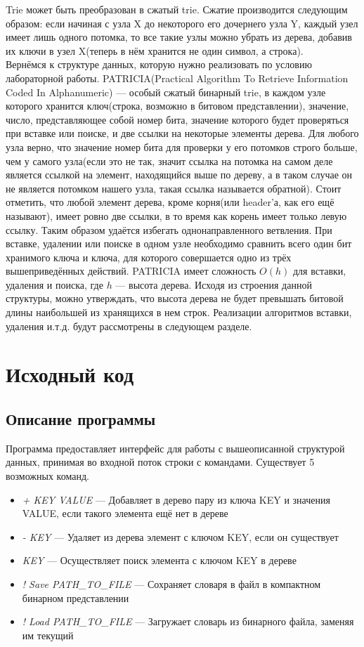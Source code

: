 Trie может быть преобразован в сжатый trie. Сжатие производится следующим образом: если начиная с узла X до некоторого его дочернего узла Y, каждый узел имеет лишь одного потомка, то все такие узлы можно убрать из дерева, добавив их ключи в узел X(теперь в нём хранится не один символ, а строка).\\

Вернёмся к структуре данных, которую нужно реализовать по условию лабораторной работы.
PATRICIA(Practical Algorithm To Retrieve Information Coded In Alphanumeric) --- особый сжатый бинарный trie, в каждом узле которого хранится ключ(строка, возможно в битовом представлении), значение, число, представляющее собой номер бита, значение которого будет проверяться при вставке или поиске, и две ссылки на некоторые элементы дерева. Для любого узла верно, что значение номер бита для проверки у его потомков строго больше, чем у самого узла(если это не так, значит ссылка на потомка на самом деле является ссылкой на элемент, находящийся выше по дереву, а в таком случае он не является потомком нашего узла, такая ссылка называется обратной). Стоит отметить, что любой элемент дерева, кроме корня(или header'а, как его ещё называют), имеет ровно две ссылки, в то время как корень имеет только левую ссылку.  Таким образом удаётся избегать однонаправленного ветвления. При вставке, удалении или поиске в одном узле необходимо сравнить всего один бит хранимого ключа и ключа, для которого совершается одно из трёх вышеприведённых действий. PATRICIA имеет сложность $O(h)$ для вставки, удаления и поиска, где $h$ --- высота дерева. Исходя из строения данной структуры, можно утверждать, что высота дерева не будет превышать битовой длины наибольшей из хранящихся в нем строк. Реализации алгоритмов вставки, удаления и.т.д. будут рассмотрены в следующем разделе.

\pagebreak

\section{Исходный код}

\subsection{Описание программы}
Программа предоставляет интерфейс для работы с вышеописанной структурой данных, принимая во входной поток строки с командами. Существует 5 возможных команд.
\begin{itemize}
  \item \textit{+ KEY VALUE} ---  Добавляет в дерево пару из ключа KEY и значения VALUE, если такого элемента ещё нет в дереве
  \item \textit{- KEY} --- Удаляет из дерева элемент с ключом KEY, если он существует
  \item \textit{KEY} --- Осуществляет поиск элемента с ключом KEY в дереве
  \item \textit{! Save PATH\_TO\_FILE} --- Сохраняет словаря в файл в компактном бинарном представлении
  \item \textit{! Load PATH\_TO\_FILE} --- Загружает словарь из бинарного файла, заменяя им текущий
\end{itemize}

